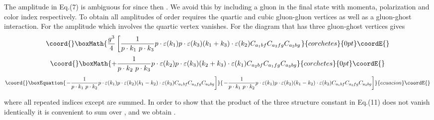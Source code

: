 \documentclass[a4paper,12pt]{article}
\begin{document}
The amplitude in Eq.(7) is ambiguous for \coordHE{} since then \coordHE{}.  We avoid this by including a gluon in the final state with momenta, polarization and color index \coordHE{} respectively.  To obtain all amplitudes of order \coordHE{} requires the quartic and cubic gluon-gluon vertices as well as a gluon-ghost interaction.  For \coordHE{} the amplitude which involves the quartic vertex vanishes.  For \coordHE{} the diagram that has three gluon-ghost vertices gives
\begin{displaymath}\coord{}\boxMath{
\frac{g^{3}}{4} \left[ \frac{1}{p \cdot k_{1} \, \, p \cdot k_{3}} p \cdot \varepsilon (k_{1}) p \cdot \varepsilon (k_{3})  (k_{1} + k_{3}) \cdot \varepsilon (k_{2})  C_{a_{1}bf} C_{a_{2}fg} C_{a_{3}bg}
\right .
}{corchetes}{0pt}\coordE{}\end{displaymath}
\begin{displaymath}\coord{}\boxMath{
+ \frac{1}{p \cdot k_{2} \, \, p \cdot k_{3}} p \cdot \varepsilon (k_{2}) p \cdot \varepsilon (k_{3})  (k_{2} + k_{3}) \cdot \varepsilon (k_{1})  C_{a_{2}bf} C_{a_{1}fg} C_{a_{3}bg}
}{corchetes}{0pt}\coordE{}\end{displaymath}
\begin{equation}\coord{}\boxEquation{
\left .
- \frac{1}{p \cdot k_{1} \, \, p \cdot k_{2}} p \cdot \varepsilon (k_{1}) p \cdot \varepsilon (k_{2})  (k_{1} - k_{2}) \cdot \varepsilon (k_{3})  C_{a_{1}bf} C_{a_{3}fg} C_{a_{2}bg} \right]
}{
\left .
- \frac{1}{p \cdot k_{1} \, \, p \cdot k_{2}} p \cdot \varepsilon (k_{1}) p \cdot \varepsilon (k_{2})  (k_{1} - k_{2}) \cdot \varepsilon (k_{3})  C_{a_{1}bf} C_{a_{3}fg} C_{a_{2}bg} \right]
}{ecuacion}\coordE{}\end{equation}

where all repeated indices except \coordHE{} are summed.  In order to show that the product of the three structure constant in Eq.(11) does not vanish identically it is convenient to sum over \coordHE{}, and we obtain \coordHE{}.
\end{document}
